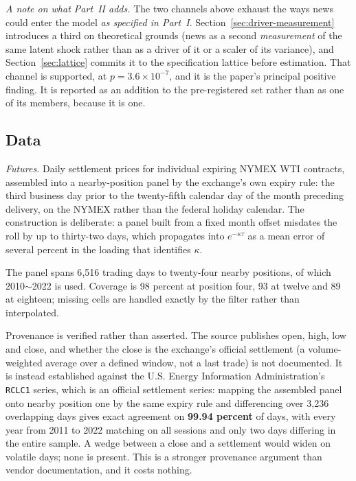 \documentclass[journal]{IEEEtran}
\newcommand{\rng}{\ensuremath{\sim}}
\begin{document}
\emph{A note on what Part~II adds.} The two channels above exhaust the ways news could enter the model \emph{as specified in Part~I}. Section~\ref{sec:driver-measurement} introduces a third on theoretical grounds (news as a second \emph{measurement} of the same latent shock rather than as a driver of it or a scaler of its variance), and Section~\ref{sec:lattice} commits it to the specification lattice before estimation. That channel is supported, at $p = 3.6\times10^{-7}$, and it is the paper's principal positive finding. It is reported as an addition to the pre-registered set rather than as one of its members, because it is one.

\subsection{Data}
\label{sec:data}

\emph{Futures.} Daily settlement prices for individual expiring NYMEX WTI contracts, assembled into a nearby-position panel by the exchange's own expiry rule: the third business day prior to the twenty-fifth calendar day of the month preceding delivery, on the NYMEX rather than the federal holiday calendar. The construction is deliberate: a panel built from a fixed month offset misdates the roll by up to thirty-two days, which propagates into $e^{-\kappa\tau}$ as a mean error of several percent in the loading that identifies $\kappa$.

The panel spans 6{,}516 trading days to twenty-four nearby positions, of which 2010\rng{}2022 is used. Coverage is 98 percent at position four, 93 at twelve and 89 at eighteen; missing cells are handled exactly by the filter rather than interpolated.

Provenance is verified rather than asserted. The source publishes open, high, low and close, and whether the close is the exchange's official settlement (a volume-weighted average over a defined window, not a last trade) is not documented. It is instead established against the U.S. Energy Information Administration's \texttt{RCLC1} series, which is an official settlement series: mapping the assembled panel onto nearby position one by the same expiry rule and differencing over 3{,}236 overlapping days gives exact agreement on \textbf{99.94 percent} of days, with every year from 2011 to 2022 matching on all sessions and only two days differing in the entire sample. A wedge between a close and a settlement would widen on volatile days; none is present. This is a stronger provenance argument than vendor documentation, and it costs nothing.
\end{document}
